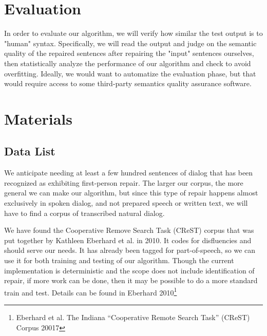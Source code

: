\documentclass{article}
\begin{document}
\section{Evaluation}

\begin{flushleft}

In order to evaluate our algorithm, we will verify how similar the test output is to "human" syntax. Specifically, we will read the output and judge on the semantic quality of the repaired sentences after repairing the "input" sentences ourselves, then statistically analyze the performance of our algorithm and check to avoid overfitting. Ideally, we would want to automatize the evaluation phase, but that would require access to some third-party semantics quality assurance software.

\end{flushleft}


\section{Materials}
\subsection{Data List}

\begin{flushleft}

We anticipate needing at least a few hundred sentences of dialog that has been recognized as exhibiting first-person repair. The larger our corpus, the more general we can make our algorithm, but since this type of repair happens almost exclusively in spoken dialog, and not prepared speech or written text, we will have to find a corpus of transcribed natural dialog.

\end{flushleft}

\begin{flushleft}

We have found the Cooperative Remove Search Task (CReST) corpus that was put together by Kathleen Eberhard et al. in 2010. It codes for disfluencies and should serve our needs. It has already been tagged for part-of-speech, so we can use it for both training and testing of our algorithm. Though the current implementation is deterministic and the scope does not include identification of repair, if more work can be done, then it may be possible to do a more standard train and test. Details can be found in Eberhard 2010\footnote{Eberhard et al. The Indiana ``Cooperative Remote Search Task'' (CReST) Corpus 20017}

\end{flushleft}
\end{document}
